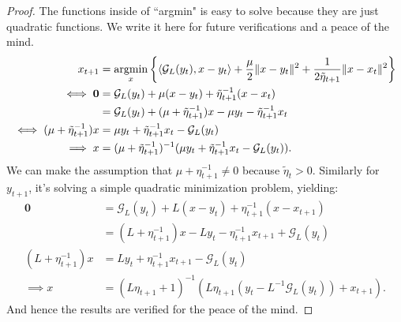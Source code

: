 \documentclass[12pt]{article}
\begin{document}
        \begin{proof}
            The functions inside of ``argmin" is easy to solve because they are just quadratic functions. 
            We write it here for future verifications and a peace of the mind. 
            \begin{align*}
                x_{t + 1} &= \mathop{\rm argmin}\limits_{x}\left\lbrace
                    \langle \mathcal G_L(y_t), x - y_t\rangle 
                    + 
                    \frac{\mu}{2}\Vert x - y_t\Vert^2 +  
                    \frac{1}{2\tilde \eta_{t + 1}}\Vert x - x_t\Vert^2
                \right\rbrace
                \\
                \iff 
                \mathbf 0 & = 
                \mathcal G_L(y_t) + \mu(x - y_t) + \tilde \eta_{t + 1}^{-1}(x - x_t)
                \\
                &= 
                \mathcal G_L(y_t) + (\mu + \tilde \eta_{t + 1}^{-1}) x - \mu y_t - \tilde \eta_{t + 1}^{-1} x_t
                \\
                \iff 
                (\mu + \tilde \eta_{t + 1}^{-1})x 
                &= 
                \mu y_t + \tilde \eta_{t + 1}^{-1} x_t - \mathcal G_L(y_t)
                \\
                \implies 
                x &= (\mu + \tilde \eta_{t + 1}^{-1})^{-1 }
                (\mu y_t + \tilde \eta_{t + 1}^{-1} x_t - \mathcal G_L(y_t)). 
            \end{align*}
            We can make the assumption that $\mu + \eta_{t + 1}^{-1} \neq 0$ because $\tilde\eta_t > 0$. 
            Similarly for $y_{t + 1}$, it's solving a simple quadratic minimization problem, yielding: 
            \begin{align*}
                \mathbf 0 &= \mathcal G_L(y_t) + L(x - y_t) + \eta_{t + 1}^{-1}(x - x_{t + 1})
                \\
                &= (L + \eta_{t + 1}^{-1})x - L y_t - \eta_{t + 1}^{-1}x_{t + 1} + \mathcal G_L(y_t) 
                \\
                (L + \eta_{t + 1}^{-1})x &= 
                Ly_t + \eta_{t + 1}^{-1} x_{t + 1} - \mathcal G_L(y_t)
                \\
                \implies 
                x &= 
                (L\eta_{t + 1} + 1)^{-1}(L\eta_{t + 1}(y_t - L^{-1}\mathcal G_L(y_t)) + x_{t + 1}). 
            \end{align*}
            And hence the results are verified for the peace of the mind. 
        \end{proof}
\end{document}
